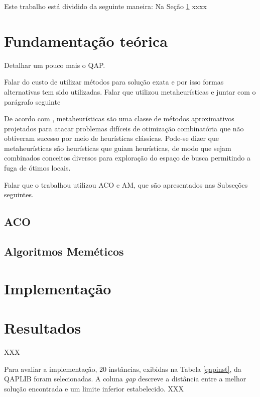 Este trabalho está dividido da seguinte maneira: Na Seção \ref{sec:fund}
xxxx

\section{Fundamentação teórica}
\label{sec:fund}

Detalhar um pouco mais o QAP.

Falar do custo de utilizar métodos para solução exata e
por isso formas alternativas tem sido utilizadas.
Falar que utilizou metaheurísticas e juntar com o parágrafo seguinte

De acordo com \cite{metatheory}, metaheurísticas são uma
classe de métodos aproximativos projetados para atacar problemas
difíceis de otimização combinatória que não obtiveram sucesso por meio
de heurísticas clássicas. Pode-se dizer que metaheurísticas são
heurísticas que guiam heurísticas, de modo que sejam combinados
conceitos diversos para exploração do espaço de busca permitindo a
fuga de ótimos locais.

Falar que o trabalhou utilizou ACO e AM, que são apresentados nas
Subseções seguintes.

\subsection{ACO}

\subsection{Algoritmos Meméticos}



\section{Implementação}



\section{Resultados}

XXX

Para avaliar a implementação, 20 instâncias, exibidas na Tabela
\ref{qapinst}, da QAPLIB \cite{qaplib} foram selecionadas. A coluna
\textit{gap} descreve a distância entre a melhor solução encontrada e
um limite inferior estabelecido. XXX



